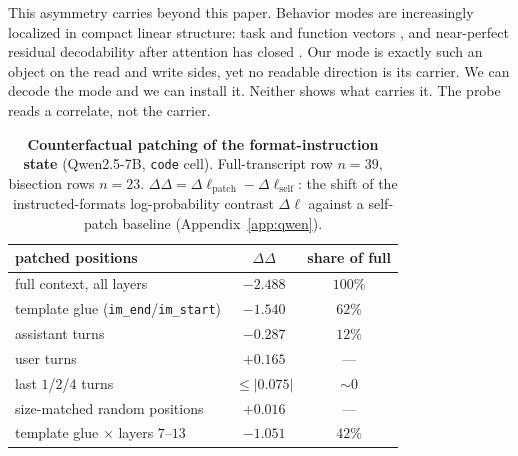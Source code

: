 \documentclass{article}
\begin{document}
This asymmetry carries beyond this paper. Behavior modes are
increasingly localized in compact linear structure: task and function vectors
\citep{hendel2023taskvectors,todd2024functionvectors}, and near-perfect residual decodability
after attention has closed \citep{dongre2026attentioncloses}. Our mode is exactly such an object
on the read and write sides, yet no readable direction is its carrier. We can decode the mode
and we can install it. Neither shows what carries it. The probe reads a correlate, not the
carrier.

\begin{table}[t]
  \centering\small
  \caption{\textbf{Counterfactual patching of the format-instruction state} (Qwen2.5-7B,
  \texttt{code} cell). Full-transcript row $n{=}39$, bisection rows $n{=}23$.
  $\Delta\Delta = \Delta\ell_{\mathrm{patch}} - \Delta\ell_{\mathrm{self}}$: the shift of the
  instructed-formats log-probability contrast $\Delta\ell$ against a self-patch baseline
  (Appendix~\ref{app:qwen}).}
  \label{tab:patch}
  \setlength{\tabcolsep}{5pt}
  \begin{tabular}{lcc}
    \toprule
    patched positions & $\Delta\Delta$ & share of full\\
    \midrule
    full context, all layers & $-2.488$ & $100\%$\\
    template glue (\texttt{im\_end}/\texttt{im\_start}) & $-1.540$ & $62\%$\\
    assistant turns & $-0.287$ & $12\%$\\
    user turns & $+0.165$ & ---\\
    last $1$/$2$/$4$ turns & $\leq|0.075|$ & ${\sim}0$\\
    size-matched random positions & $+0.016$ & ---\\
    template glue $\times$ layers $7$--$13$ & $-1.051$ & $42\%$\\
    \bottomrule
  \end{tabular}
\end{table}
\end{document}
